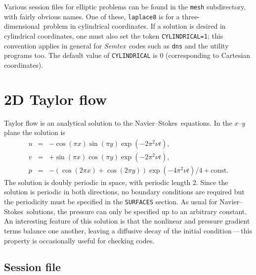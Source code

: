 \documentclass[11pt]{report}
\newcommand{\Semtex}{\emph{Semtex}} \newcommand{\Dog}{\emph{Dog}}
\newcommand\threed{three-di\-men\-sion\-al}
\newcommand\NavSto{Navier--Stokes}
\begin{document}
Various session files for elliptic problems can be found in the
\verb|mesh| subdirectory, with fairly obvious names. One of these,
\verb|laplace8| is for a \threed\ problem in cylindrical coordinates.
If a solution is desired in cylindrical coordinates, one must also set
the token \verb|CYLINDRICAL=1|; this convention applies in general for
\Semtex\ codes such as \verb|dns| and the utility programs too.  The
default value of \verb|CYLINDRICAL| is 0 (corresponding to Cartesian
coordinates).


\section{2D Taylor flow}
\label{sec.taylor}

Taylor flow is an analytical solution to the \NavSto\ equations.
In the $x$--$y$ plane the solution is 
\begin{eqnarray}
        u &=& -\cos(\pi x) \sin(\pi y) \exp(-2\pi^2\nu t),\\
        v &=& +\sin(\pi x) \cos(\pi y) \exp(-2\pi^2\nu t),\\
        p &=& -(\cos(2\pi x) + \cos(2\pi y)) \exp(-4\pi^2\nu t)/4
            + \textrm{const}.
\end{eqnarray}
The solution is doubly periodic in space, with periodic length 2.
Since the solution is periodic in both directions, no boundary
conditions are required but the periodicity must be specified in the
\verb|SURFACES| section.  As usual for \NavSto\ solutions, the
pressure can only be specified up to an arbitrary constant.  An
interesting feature of this solution is that the nonlinear and
pressure gradient terms balance one another, leaving a diffusive decay
of the initial condition\,---\,this property is occasionally useful for
checking codes.

\subsection{Session file}
\end{document}
